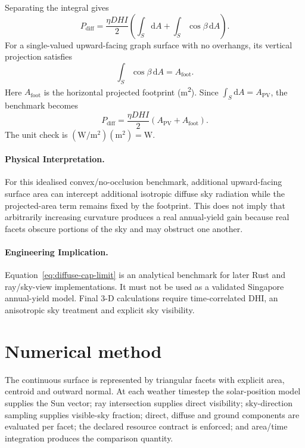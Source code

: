 \documentclass[11pt,a4paper]{article}
\begin{document}
Separating the integral gives
\begin{equation}
P_{\mathrm{diff}}
=
\frac{\eta DHI}{2}
\left(
\int_S\mathrm dA
+
\int_S\cos\beta\,\mathrm dA
\right).
\end{equation}
For a single-valued upward-facing graph surface with no overhangs, its vertical projection satisfies
\begin{equation}
\int_S\cos\beta\,\mathrm dA=A_{\mathrm{foot}}.
\label{eq:vertical-projection}
\end{equation}
Here \(A_{\mathrm{foot}}\) is the horizontal projected footprint (\si{\square\metre}). Since \(\int_S\mathrm dA=A_{\mathrm{PV}}\), the benchmark becomes
\begin{equation}
\boxed{
P_{\mathrm{diff}}
=
\frac{\eta DHI}{2}
\left(
A_{\mathrm{PV}}+A_{\mathrm{foot}}
\right)
}.
\label{eq:diffuse-cap-limit}
\end{equation}
The unit check is
\((\si{\watt\per\square\metre})(\si{\square\metre})=\si{\watt}\).

\paragraph{Physical Interpretation.}
For this idealised convex/no-occlusion benchmark, additional upward-facing surface area can intercept additional isotropic diffuse sky radiation while the projected-area term remains fixed by the footprint. This does not imply that arbitrarily increasing curvature produces a real annual-yield gain because real facets obscure portions of the sky and may obstruct one another.

\paragraph{Engineering Implication.}
Equation~\eqref{eq:diffuse-cap-limit} is an analytical benchmark for later Rust and ray/sky-view implementations. It must not be used as a validated Singapore annual-yield model. Final 3-D calculations require time-correlated DHI, an anisotropic sky treatment and explicit sky visibility.

\section{Numerical method}
The continuous surface is represented by triangular facets with explicit area, centroid and outward normal. At each weather timestep the solar-position model supplies the Sun vector; ray intersection supplies direct visibility; sky-direction sampling supplies visible-sky fraction; direct, diffuse and ground components are evaluated per facet; the declared resource contract is enforced; and area/time integration produces the comparison quantity.
\end{document}
